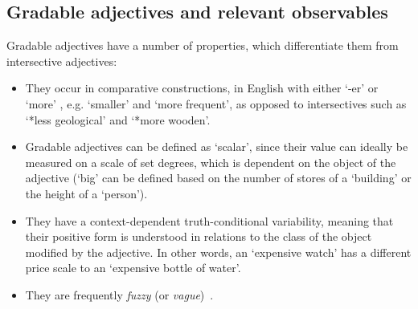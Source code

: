 \documentclass[11pt]{article}
\begin{document}
\subsection{Gradable adjectives and relevant observables} \label{sec:gradables}

Gradable adjectives have a number of properties, which differentiate them
from intersective adjectives:

\begin{itemize}[noitemsep]
\item They occur in comparative constructions, in English with either `-er' or `more' \cite{kennedy1999scalar}, e.g. `smaller' and `more frequent', as opposed to intersectives such as `*less geological' and `*more wooden'.
\item Gradable adjectives can be defined as `scalar', since their value can ideally be measured on a scale of set degrees, which is dependent on the object of the adjective (`big' can be defined based on the number of stores of a `building' or the height of a `person').
\item They have a context-dependent truth-conditional variability, meaning that their positive form
    is understood in relations to the class of the object modified by the adjective. In other words, an
    `expensive watch' has a different price scale to an `expensive bottle of water'.
\item They are frequently \emph{fuzzy} (or \emph{vague})~\cite{kennedy2007vagueness}.


\end{itemize}
\end{document}
